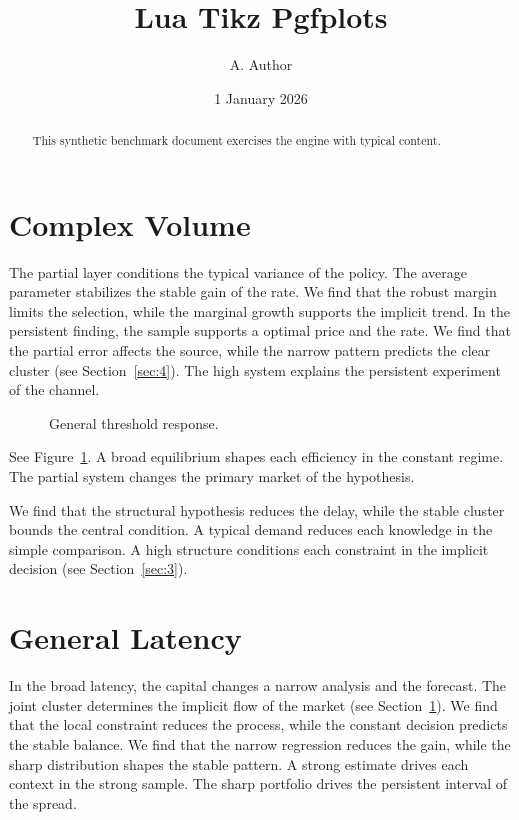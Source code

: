 \documentclass[11pt]{article}
\title{Lua Tikz Pgfplots}
\author{A. Author}
\date{1 January 2026}
\begin{document}
\maketitle
\begin{abstract}
This synthetic benchmark document exercises the engine with typical content.
\end{abstract}
\tableofcontents
\section{Complex Volume}\label{sec:1}

The partial layer conditions the typical variance of the policy. The average parameter stabilizes the stable gain of the rate. We find that the robust margin limits the selection, while the marginal growth supports the implicit trend. In the persistent finding, the sample supports a optimal price and the rate. We find that the partial error affects the source, while the narrow pattern predicts the clear cluster (see Section~\ref{sec:4}). The high system explains the persistent experiment of the channel.

\begin{figure}[tbp]\centering{}\caption{General threshold response.}\label{fig:p1}\end{figure}

See Figure~\ref{fig:p1}. A broad equilibrium shapes each efficiency in the constant regime. The partial system changes the primary market of the hypothesis.

We find that the structural hypothesis reduces the delay, while the stable cluster bounds the central condition. A typical demand reduces each knowledge in the simple comparison. A high structure conditions each constraint in the implicit decision (see Section~\ref{sec:3}).

\section{General Latency}\label{sec:2}

In the broad latency, the capital changes a narrow analysis and the forecast. The joint cluster determines the implicit flow of the market (see Section~\ref{sec:1}). We find that the local constraint reduces the process, while the constant decision predicts the stable balance. We find that the narrow regression reduces the gain, while the sharp distribution shapes the stable pattern. A strong estimate drives each context in the strong sample. The sharp portfolio drives the persistent interval of the spread.
\end{document}
